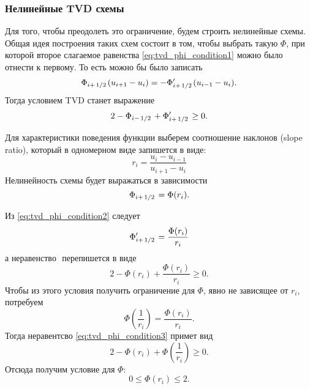 \subsubsection{Нелинейные TVD схемы}
Для того, чтобы преодолеть это ограничение, будем строить нелинейные схемы.
Общая идея построения таких схем состоит в том, чтобы выбрать такую $\Phi$,
при которой второе слагаемое равенства \cref{eq:tvd_phi_condition1} можно
было отнести к первому. То есть можно бы было записать
\begin{equation}
\label{eq:tvd_phi_condition2}
\Phi_{i+\left.1\middle/2\right.}(u_{i+1} - u_{i}) = -\Phi'_{i+\left.1\middle/2\right.} (u_{i-1} - u_{i}).
\end{equation}
Тогда условием TVD станет выражение
\begin{equation}
\label{eq:tvd_phi_condition3}
2 - \Phi_{i-\left.1\middle/2\right.} + \Phi'_{i+\left.1\middle/2\right.} \geq 0.
\end{equation}

Для характеристики поведения функции выберем соотношение наклонов (slope ratio),
который в одномерном виде запишется в виде:
\begin{equation}
\label{eq:tvd_ri}
r_i = \frac{u_i - u_{i-1}}{u_{i+1} - u_{i}}
\end{equation}
Нелинейность схемы будет выражаться в зависимости
\begin{equation*}
\Phi_{i+\left.1\middle/2\right.} = \Phi(r_i).
\end{equation*}

Из \cref{eq:tvd_phi_condition2} следует
\begin{equation*}
\Phi'_{i+\left.1\middle/2\right.} = \frac{\Phi(r_i)}{r_i}
\end{equation*}
а неравенство $\label{eq:tvd_phi_condition4}$
перепишется в виде
\begin{equation*}
\label{eq:tvd_phi_condition5}
2 - \Phi(r_i) + \frac{\Phi(r_i)}{r_i} \geq 0.
\end{equation*}
Чтобы из этого условия получить ограничение для $\Phi$, явно не зависящее от $r_i$, потребуем
\begin{equation}
\label{eq:tvd_phi_condition4}
\Phi\left(\frac{1}{r_i}\right) = \frac{\Phi(r_i)}{r_i}.
\end{equation}
Тогда неравентсво \cref{eq:tvd_phi_condition3} примет вид
\begin{equation*}
\label{eq:tvd_phi_condition6}
2 - \Phi(r_i) + \Phi\left(\frac{1}{r_i}\right) \geq 0.
\end{equation*}
Отсюда получим условие для $\Phi$:
\begin{equation}
\label{eq:tvd_phi_condition7}
0 \leq \Phi(r_i) \leq 2.
\end{equation}

